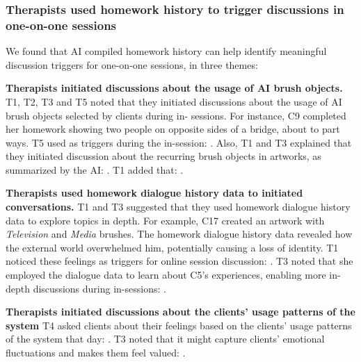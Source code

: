 \subsubsection{\textbf{Therapists used homework history to trigger discussions in one-on-one sessions}}
We found that AI compiled homework history can help identify meaningful discussion triggers for one-on-one sessions, in three themes:

\textbf{Therapists initiated discussions about the usage of AI brush objects.} 
T1, T2, T3 and T5 noted that they initiated discussions about the usage of AI brush objects selected by clients during in- sessions.
For instance, C9 completed her homework showing two people on opposite sides of a bridge, about to part ways. T5 used  as triggers during the in-session: .
Also, T1 and T3 explained that they initiated discussion about the recurring brush objects in artworks, as summarized by the AI: . 
T1 added that: .

\textbf{Therapists used homework dialogue history data to initiated conversations.} 
T1 and T3 suggested that they used homework dialogue history data to explore topics in depth. 
For example, C17 created an artwork with \textit{Television} and \textit{Media} brushes. 
The homework dialogue history data revealed how the external world overwhelmed him, potentially causing a loss of identity. 
T1 noticed these feelings as triggers for online session discussion: .
T3 noted that she employed the dialogue data to learn about C5's experiences, enabling more in-depth discussions during in-sessions: .

\textbf{Therapists  
initiated discussions about the clients' usage patterns of the system} 
T4 asked clients about their feelings based on the clients' usage patterns of the system that day: .
T3 noted that it might capture clients' emotional fluctuations and makes them feel valued: .



